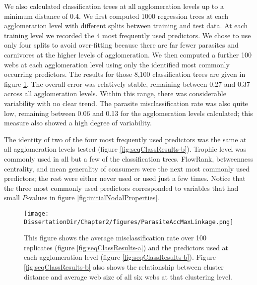 \documentclass[/home/nkappler/Research/Dissertation/dissertation.tex]{subfiles}
\begin{document}
\begin{bibunit}
We also calculated classification trees at all agglomeration levels up to a
minimum distance of 0.4. We first computed 1000 regression trees at each
agglomeration level with different splits between training and test data. At
each training level we recorded the 4 most frequently used predictors. We chose
to use only four splits to avoid over-fitting because there are far fewer
parasites and carnivores at the higher levels of agglomeration. We then
computed a further 100 webs at each agglomeration level using only the
identified most commonly occurring predictors.  The results for those 8,100
classification trees are given in figure \ref{fig:seqClassResults}. The overall
error was relatively stable, remaining between 0.27 and 0.37 across all
agglomeration levels. Within this range, there was considerable variability
with no clear trend. The parasite misclassification rate was also quite low,
remaining between 0.06 and 0.13 for the agglomeration levels calculated; this
measure also showed a high degree of variability.

The identity of two of the four most frequently used predictors was the same at
all agglomeration levels tested (figure \ref{fig:seqClassResults-b}). Trophic
level was commonly used in all but a few of the classification trees. FlowRank,
betweenness centrality, and mean generality of consumers were the next most
commonly used predictors; the rest were either never used or used just a few
times. Notice that the three most commonly used predictors corresponded to
variables that had small $P$-values in figure \ref{fig:initialNodalProperties}.

\begin{figure}
    \centering
    {%
    }%

        \texttt{[image: \\DissertationDir/Chapter2/figures/ParasiteAccMaxLinkage.png]}
        \caption[Classification tree performance on agglomerated webs]%
            {This figure shows the average misclassification rate over 100
            replicates (figure \ref{fig:seqClassResults-a}) and the predictors
            used at each agglomeration level (figure
            \ref{fig:seqClassResults-b}). Figure \ref{fig:seqClassResults-b}
            also shows the relationship between cluster distance and average
            web size of all six webs at that clustering level.  
        \label{fig:seqClassResults}} 
\end{figure}


\end{bibunit}
\end{document}

